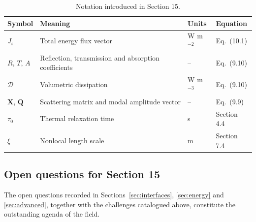 \begin{table}[htbp]
\centering
\small
\caption{Notation introduced in Section 15.}
\label{tab:notation-sec15}
\begin{tabularx}{\textwidth}{@{}p{1.8cm}X p{2.2cm}p{2.1cm}@{}}
\toprule
\textbf{Symbol} & \textbf{Meaning} & \textbf{Units} & \textbf{Equation} \\
\midrule
$J_i$ & Total energy flux vector & W m$^{-2}$ & Eq.~(10.1) \\
$R$, $T$, $A$ & Reflection, transmission and absorption coefficients & -- & Eq.~(9.10) \\
$\mathcal{D}$ & Volumetric dissipation & W m$^{-3}$ & Eq.~(9.10) \\
$\bm{X}$, $\bm{Q}$ & Scattering matrix and modal amplitude vector & -- & Eq.~(9.9) \\
$\tau_0$ & Thermal relaxation time & s & Section 4.4 \\
$\xi$ & Nonlocal length scale & m & Section 7.4 \\
\bottomrule
\end{tabularx}
\end{table}

\subsection{Open questions for Section 15}

The open questions recorded in Sections~\ref{sec:interfaces}, \ref{sec:energy} and \ref{sec:advanced}, together with the challenges catalogued above, constitute the outstanding agenda of the field.

